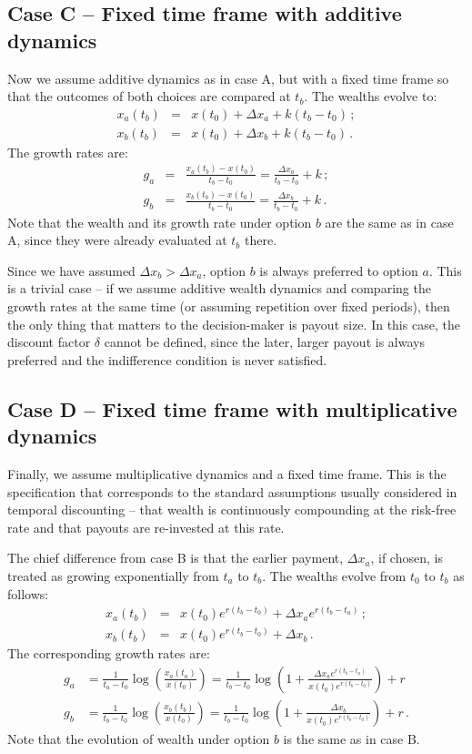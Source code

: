 \documentclass[11pt]{article}
\newcommand{\bea}{\begin{eqnarray}}
\newcommand{\eea}{\end{eqnarray}}
\newcommand{\Dx}{\Delta x}
\numberwithin{equation}{section}
\begin{document}
\subsection{Case C -- Fixed time frame with additive dynamics}\label{sec:case_C}

Now we assume additive dynamics as in case A, but with a fixed time frame so that the outcomes of both choices are compared at $t_b$. The wealths evolve to: \bea
x_a\left(t_b\right) &=& x\left(t_0\right) + \Dx_a + k(t_b-t_0)\,; \\
x_b\left(t_b\right) &=& x\left(t_0\right) + \Dx_b + k(t_b-t_0)\,.
\eea
The growth rates are:
\bea
g_a &=& \frac{x_a\left(t_b\right) - x\left(t_0\right)}{t_b-t_0} = \frac{\Dx_a}{t_b-t_0} + k\,;\\
g_b &=& \frac{x_b\left(t_b\right) - x\left(t_0\right)}{t_b-t_0} = \frac{\Dx_b}{t_b-t_0} + k\,.
\eea
Note that the wealth and its growth rate under option $b$ are the same as in case A, since they were already evaluated at $t_b$ there.

Since we have assumed $\Dx_b > \Dx_a$, option $b$ is always preferred to option $a$. This is a trivial case -- if we assume additive wealth dynamics and comparing the growth rates at the same time (or assuming repetition over fixed periods), then the only thing that matters to the decision-maker is payout size. In this case, the discount factor $\delta$ cannot be defined, since the later, larger payout is always preferred and the indifference condition is never satisfied.

\subsection{Case D -- Fixed time frame with multiplicative dynamics}\label{sec:case_D}

Finally, we assume multiplicative dynamics and a fixed time frame. This is the specification that corresponds to the standard assumptions usually considered in temporal discounting -- that wealth is continuously compounding at the risk-free rate and that payouts are re-invested at this rate.

The chief difference from case B is that the earlier payment, $\Dx_a$, if chosen, is treated as growing exponentially from $t_a$ to $t_b$. The wealths evolve from $t_0$ to $t_b$ as follows:
\bea
x_a\left(t_b\right) &=& x\left(t_0\right) e^{r(t_b-t_0)} + \Dx_a e^{r(t_b-t_a)}\,;\\
x_b\left(t_b\right) &=& x\left(t_0\right) e^{r(t_b-t_0)} + \Dx_b\,.
\eea
The corresponding growth rates are:
\bea
g_a &= \frac{1}{t_a-t_0} \log{\left(\frac{x_a\left(t_a\right)}{x\left(t_0\right)}\right)} = \frac{1}{t_b-t_0}\log{\left(1 + \frac{\Dx_a e^{r(t_b-t_a)}}{x\left(t_0\right)e^{r(t_b-t_0)}}\right)} + r\\
g_b &= \frac{1}{t_b-t_0} \log{\left(\frac{x_b\left(t_b\right)}{x\left(t_0\right)}\right)} = \frac{1}{t_b-t_0}\log{\left(1 + \frac{\Dx_b}{x\left(t_0\right)e^{r(t_b-t_0)}}\right)} + r\,.
\eea
Note that the evolution of wealth under option $b$ is the same as in case B.
\end{document}
